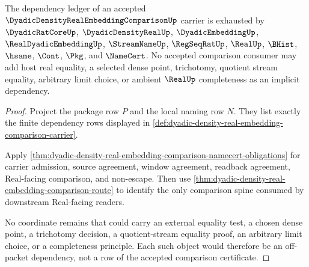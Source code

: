 \begin{theorem}
\label{thm:dyadic-density-real-embedding-comparison-nonescape}
The dependency ledger of an accepted
$\DyadicDensityRealEmbeddingComparisonUp$ carrier is exhausted by
$\DyadicRatCoreUp$, $\DyadicDensityRealUp$, $\DyadicEmbeddingUp$,
$\RealDyadicEmbeddingUp$, $\StreamNameUp$, $\RegSeqRatUp$, $\RealUp$,
$\BHist$, $\hsame$, $\Cont$, $\Pkg$, and $\NameCert$. No accepted comparison
consumer may add host real equality, a selected dense point, trichotomy,
quotient stream equality, arbitrary limit choice, or ambient $\RealUp$
completeness as an implicit dependency.
\end{theorem}
\begin{proof}
Project the package row $P$ and the local naming row $N$. They list exactly
the finite dependency rows displayed in
\autoref{def:dyadic-density-real-embedding-comparison-carrier}.

Apply
\autoref{thm:dyadic-density-real-embedding-comparison-namecert-obligations}
for carrier admission, source agreement, window agreement, readback
agreement, Real-facing comparison, and non-escape. Then use
\autoref{thm:dyadic-density-real-embedding-comparison-route} to identify the
only comparison spine consumed by downstream Real-facing readers.

No coordinate remains that could carry an external equality test, a chosen
dense point, a trichotomy decision, a quotient-stream equality proof, an
arbitrary limit choice, or a completeness principle. Each such object would
therefore be an off-packet dependency, not a row of the accepted comparison
certificate.
\end{proof}

\begin{closurestatus}{\DyadicDensityRealEmbeddingComparisonUp}
  \theoryclosure{\seedClosure}
  \formalstatus{\unformalizedV}
\end{closurestatus}
